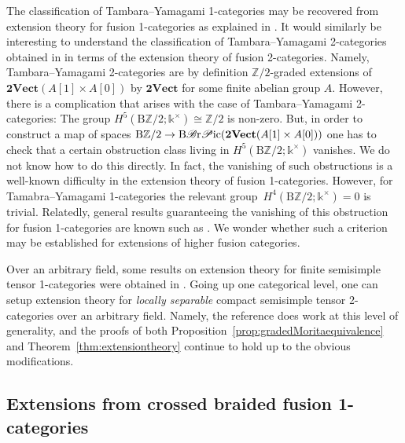 \documentclass[pdftex]{sigma}
\numberwithin{equation}{section}
\begin{document}
\begin{Remark}
The classification of Tambara--Yamagami 1-categories may be recovered from extension theory for fusion 1-categories as explained in \cite[Section~9.2]{ENO2}. It would similarly be interesting to understand the classification of Tambara--Yamagami 2-categories obtained in \cite[Proposition~5.2.3]{DY23} in terms of the extension theory of fusion 2-categories. Namely, Tambara--Yamagami 2-categories are by definition $\mathbb{Z}/2$-graded extensions of $\mathbf{2Vect}(A[1]\times A[0])$ by $\mathbf{2Vect}$ for some finite abelian group $A$. However, there is a complication that arises with the case of Tambara--Yamagami 2-categories: The group $H^5(\mathrm{B}\mathbb{Z}/2;\mathds{k}^{\times})\cong\mathbb{Z}/2$ is non-zero. But, in order to construct a map of spaces $\mathrm{B}\mathbb{Z}/2\rightarrow \mathrm{B}\mathscr{B}{\rm r}\mathscr{P}{\rm ic}(\mathbf{2Vect}(A[1]\times A[0]))$ one has to check that a certain obstruction class living in $H^5(\mathrm{B}\mathbb{Z}/2;\mathds{k}^{\times})$ vanishes. We do not know how to do this directly. In fact, the vanishing of such obstructions is a well-known difficulty in the extension theory of fusion 1-categories. However, for Tamabra--Yamagami 1-categories the relevant group~${H^4(\mathrm{B}\mathbb{Z}/2;\mathds{k}^{\times})=0}$ is trivial. Relatedly, general results guaranteeing the vanishing of this obstruction for fusion 1-categories are known such as \cite[Theorem~8.16]{ENO2}. We wonder whether such a criterion may be established for extensions of higher fusion categories.
\end{Remark}

\begin{Remark}
Over an arbitrary field, some results on extension theory for finite semisimple tensor 1-categories were obtained in \cite{San}. Going up one categorical level, one can setup extension theory for \textit{locally separable} compact semisimple tensor 2-categories over an arbitrary field. Namely, the reference \cite{D10} does work at this level of generality, and the proofs of both Proposition~\ref{prop:gradedMoritaequivalence} and Theorem~\ref{thm:extensiontheory} continue to hold up to the obvious modifications.
\end{Remark}

\subsection{Extensions from crossed braided fusion 1-categories}
\end{document}
